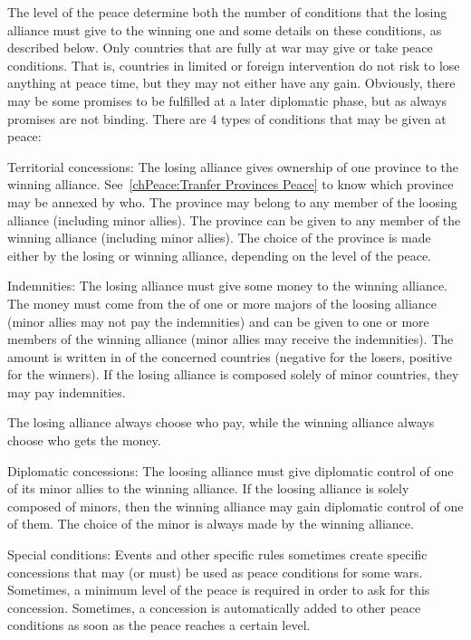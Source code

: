 The level of the peace determine both the number of
conditions that the losing alliance must give to the winning one and some
details on these conditions, as described below.
\bparag Only countries that are fully at war may give or take peace
conditions. That is, countries in limited or foreign intervention do not risk
to lose anything at peace time, but they may not either have any
gain. Obviously, there may be some promises to be fulfilled at a later
diplomatic phase, but as always promises are not binding.
\bparag There are 4 types of conditions that may be given at peace:
\begin{modlist}
\item[Territorial concessions:] The losing alliance gives ownership of one
  province to the winning alliance. See~\ref{chPeace:Tranfer Provinces Peace}
  to know which province may be annexed by who. The province may belong to any
  member of the loosing alliance (including minor allies). The province can be
  given to any member of the winning alliance (including minor allies). The
  choice of the province is made either by the losing or winning alliance,
  depending on the level of the peace.
\item[Indemnities:] The losing alliance must give some money to the winning
  alliance. The money must come from the \RT of one or more majors of the
  loosing alliance (minor allies may not pay the indemnities) and can be given
  to one or more members of the winning alliance (minor allies may receive the
  indemnities). The amount is written in  of the
  concerned countries (negative for the losers, positive for the winners). If
  the losing alliance is composed solely of minor countries, they may pay
  indemnities.

  The losing alliance always choose who pay, while the winning alliance always
  choose who gets the money.
\item[Diplomatic concessions:] The loosing alliance must give diplomatic
  control of one of its minor allies to the winning alliance. If the loosing
  alliance is solely composed of minors, then the winning alliance may gain
  diplomatic control of one of them. The choice of the minor is always made by
  the winning alliance.
\item[Special conditions:] Events and other specific rules sometimes create
  specific concessions that may (or must) be used as peace conditions for some
  wars. Sometimes, a minimum level of the peace is required in order to ask
  for this concession. Sometimes, a concession is automatically added to other
  peace conditions as soon as the peace reaches a certain level.
\end{modlist}

